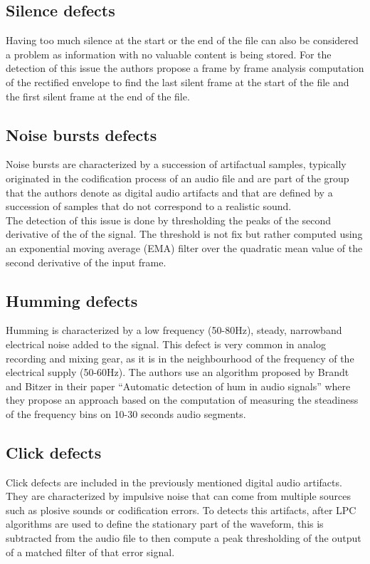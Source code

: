 \subsection{Silence defects}
Having too much silence at the start or the end of the file can also be considered a problem as information with no valuable 
content is being stored. For the detection of this issue the authors propose a frame by frame analysis computation of the rectified 
envelope to find the last silent frame at the start of the file and the first silent frame at the end of the file. \\
\subsection{Noise bursts defects}
Noise bursts are characterized by a succession of artifactual samples, typically originated in the codification process of an audio 
file and are part of the group that the authors denote as digital audio artifacts and that are defined by a succession of samples 
that do not correspond to a realistic sound. \\
The detection of this issue is done by thresholding the peaks of the second derivative of the of the signal. The threshold is not 
fix but rather computed using an exponential moving average (EMA) filter over the quadratic mean value of the second derivative of 
the input frame.\\
\subsection{Humming defects}
Humming is characterized by a low frequency (50-80Hz), steady, narrowband electrical noise added to the signal. This defect is very
common in analog recording and mixing gear, as it is in the neighbourhood of the frequency of the electrical supply (50-60Hz). 
The authors use an algorithm proposed by Brandt and Bitzer in their paper “Automatic detection of hum in audio signals” where they 
propose an approach based on the computation of measuring the steadiness of the frequency bins on 10-30 seconds audio segments.\\
\subsection{Click defects}
Click defects are included in the previously mentioned digital audio artifacts. They are characterized by impulsive noise that 
can come from multiple sources such as plosive sounds or codification errors. To detects this artifacts, after LPC algorithms 
are used to define the stationary part of the waveform, this is subtracted from the audio file to then compute a peak thresholding 
of the output of a matched filter of that error signal.\\
